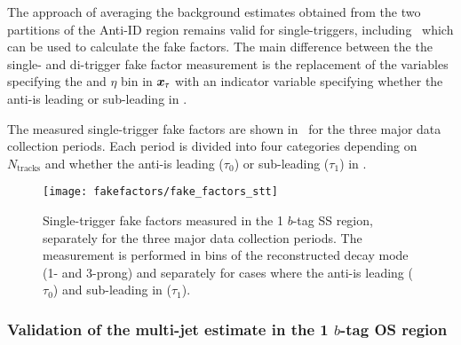 The approach of averaging the background estimates obtained from the
two partitions of the Anti-ID region remains valid for
single-\tauhadvis triggers, including~
which can be used to calculate the fake factors. The main difference
between the the single- and di-\tauhadvis trigger fake factor
measurement is the replacement of the variables specifying the \pT and
$\eta$ bin in $\bm{x}_\tau$ with an indicator variable specifying
whether the anti-\tauhadvis is leading or sub-leading in \pT.


The measured single-\tauhadvis trigger fake factors are shown
in~ for the three major data collection
periods. Each period is divided into four categories depending on
$N_{\text{tracks}}$ and whether the anti-\tauhadvis is leading
($\tau_0$) or sub-leading ($\tau_1$) in \pT.

\begin{figure}[htbp]
  \centering

  \texttt{[image: fakefactors/fake\_factors\_stt]}

  \caption{Single-\tauhadvis trigger fake factors measured in the 1
    $b$-tag SS region, separately for the three major data collection
    periods. The measurement is performed in bins of the reconstructed
    \tauhadvis decay mode (1- and 3-prong) and separately for cases
    where the anti-\tauhadvis is leading ($\tau_0$) and sub-leading in
    \pT ($\tau_1$).}%
  \label{fig:mjfakes_stt_ffs}
\end{figure}


\subsubsection{Validation of the multi-jet estimate in the 1 $b$-tag OS region}

